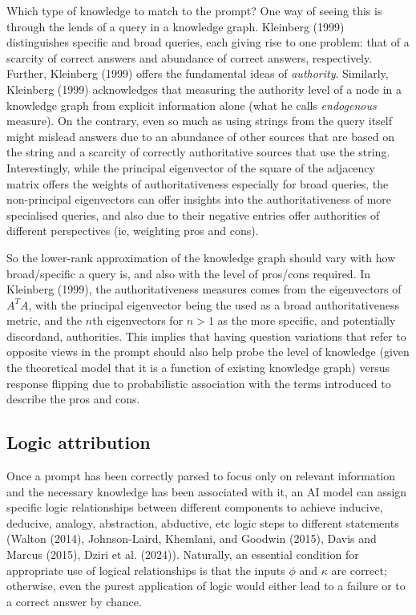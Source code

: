 \documentclass[
]{article}
\begin{document}
Which type of knowledge to match to the prompt? One way of seeing this
is through the lends of a query in a knowledge graph. Kleinberg (1999)
distinguishes specific and broad queries, each giving rise to one
problem: that of a scarcity of correct answers and abundance of correct
answers, respectively. Further, Kleinberg (1999) offers the fundamental
ideas of \emph{authority}. Similarly, Kleinberg (1999) acknowledges that
measuring the authority level of a node in a knowledge graph from
explicit information alone (what he calls \emph{endogenous} measure). On
the contrary, even so much as using strings from the query itself might
mislead answers due to an abundance of other sources that are based on
the string and a scarcity of correctly authoritative sources that use
the string. Interestingly, while the principal eigenvector of the square
of the adjacency matrix offers the weights of authoritativeness
especially for broad queries, the non-principal eigenvectors can offer
insights into the authoritativeness of more specialised queries, and
also due to their negative entries offer authorities of different
perspectives (ie, weighting pros and cons).

So the lower-rank approximation of the knowledge graph should vary with
how broad/specific a query is, and also with the level of pros/cons
required. In Kleinberg (1999), the authoritativeness measures comes from
the eigenvectors of \(A^TA\), with the principal eigenvector being the
used as a broad authoritativeness metric, and the \(n\)th eigenvectors
for \(n>1\) as the more specific, and potentially discordand,
authorities. This implies that having question variations that refer to
opposite views in the prompt should also help probe the level of
knowledge (given the theoretical model that it is a function of existing
knowledge graph) versus response flipping due to probabilistic
association with the terms introduced to describe the pros and cons.

\subsection{Logic attribution}\label{logic-attribution}

Once a prompt has been correctly parsed to focus only on relevant
information and the necessary knowledge has been associated with it, an
AI model can assign specific logic relationships between different
components to achieve inducive, deducive, analogy, abstraction,
abductive, etc logic steps to different statements (Walton (2014),
Johnson-Laird, Khemlani, and Goodwin (2015), Davis and Marcus (2015),
Dziri et al. (2024)). Naturally, an essential condition for appropriate
use of logical relationships is that the inputs \(\phi\) and \(\kappa\)
are correct; otherwise, even the purest application of logic would
either lead to a failure or to a correct answer by chance.
\end{document}
